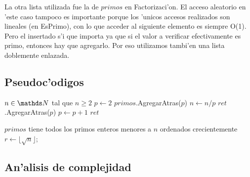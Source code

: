La otra lista utilizada fue la de $primos$ en Factorizaci'on. El acceso aleatorio en 'este caso tampoco es importante porque los 'unicos accesos realizados son lineales (en EsPrimo), con lo que acceder al siguiente elemento es siempre O(1). Pero el insertado s'i que importa ya que si el valor a verificar efectivamente es primo, entonces hay que agregarlo. Por eso utilizamos tambi'en una lista doblemente enlazada.


\clearpage
\subsection{Pseudoc'odigos}

\begin{algorithmic}[1]
\REQUIRE $n \in \nat$ tal que $n \geq 2$
	\STATE $p \leftarrow 2$
			\STATE $primos$.AgregarAtras($p$)
				\STATE $n \leftarrow n / p$
				\STATE $ret$.AgregarAtras($p$)
			\ENDWHILE
		\ENDIF
		\STATE $p \leftarrow p + 1$
	\ENDWHILE
	\RETURN $ret$
\end{algorithmic}

\vspace{2em}

\begin{algorithmic}[1]
\REQUIRE $primos$ tiene todos los primos enteros menores a $n$ ordenados crecientemente
	\STATE $r \leftarrow \lfloor \sqrt{n} \rfloor$;
			 \RETURN \FALSE \ENDIF
		\ENDFOR
	\RETURN \TRUE
\end{algorithmic}

\clearpage


\subsection{An'alisis de complejidad}
